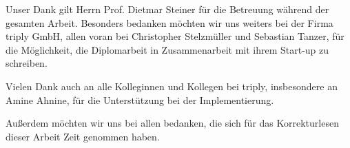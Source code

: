 
Unser Dank gilt Herrn Prof. Dietmar Steiner für die Betreuung während der gesamten Arbeit.
Besonders bedanken möchten wir uns weiters bei der Firma triply GmbH, allen voran bei Christopher Stelzmüller
und Sebastian Tanzer, für die Möglichkeit, die Diplomarbeit in Zusammenarbeit mit ihrem Start-up zu schreiben.


Vielen Dank auch an alle Kolleginnen und Kollegen bei triply, insbesondere an Amine Ahnine, für die Unterstützung bei der Implementierung.


Außerdem möchten wir uns bei allen bedanken, die sich für das Korrekturlesen dieser Arbeit Zeit genommen haben.
